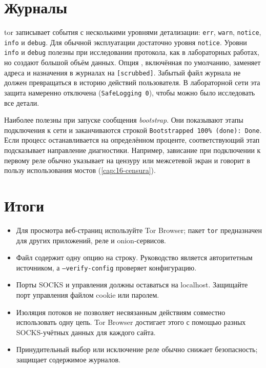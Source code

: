 \section{Журналы}\label{sec:torrc-log}

tor записывает события с несколькими уровнями детализации: \texttt{err}, \texttt{warn}, \texttt{notice}, \texttt{info} и \texttt{debug}. Для обычной эксплуатации достаточно уровня \texttt{notice}. Уровни \texttt{info} и \texttt{debug} полезны при исследовании протокола, как в лабораторных работах, но создают большой объём данных. Опция , включённая по умолчанию, заменяет адреса и назначения в журналах на \texttt{[scrubbed]}. Забытый файл журнала не должен превращаться в историю действий пользователя. В лабораторной сети эта защита намеренно отключена (\texttt{SafeLogging 0}), чтобы можно было исследовать все детали.

Наиболее полезны при запуске сообщения \emph{bootstrap}. Они показывают этапы подключения к сети и заканчиваются строкой \texttt{Bootstrapped 100\% (done): Done}. Если процесс останавливается на определённом проценте, соответствующий этап подсказывает направление диагностики. Например, зависание при подключении к первому реле обычно указывает на цензуру или межсетевой экран и говорит в пользу использования мостов (\cref{cap:16-censura}).

\section*{Итоги}
\begin{itemize}
  \item Для просмотра веб-страниц используйте Tor Browser; пакет \texttt{tor} предназначен для других приложений, реле и onion-сервисов.
  \item Файл  содержит одну опцию на строку. Руководство является авторитетным источником, а \texttt{--verify-config} проверяет конфигурацию.
  \item Порты SOCKS и управления должны оставаться на localhost. Защищайте порт управления файлом cookie или паролем.
  \item Изоляция потоков не позволяет несвязанным действиям совместно использовать одну цепь. Tor Browser достигает этого с помощью разных SOCKS-учётных данных для каждого сайта.
  \item Принудительный выбор или исключение реле обычно снижает безопасность;  защищает содержимое журналов.
\end{itemize}

